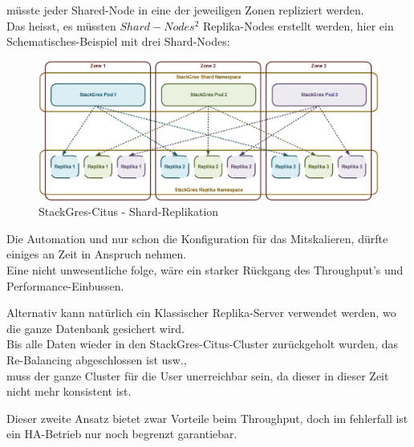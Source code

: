 \begin{flushleft}
\begin{flushleft}
\begin{flushleft}
            müsste jeder Shared-Node in eine der jeweiligen Zonen repliziert werden.\\
            Das heisst, es müssten \(Shard-Nodes^2 \) Replika-Nodes erstellt werden, hier ein Schematisches-Beispiel mit drei Shard-Nodes:
            \begin{figure}[H]
                \centering
                \includegraphics[width=0.8\linewidth]{source/implementation/evaluation/postgresql_ha_solutions/stackgres/stackgres_shard_replication}
                \caption{StackGres-Citus - Shard-Replikation}
                \label{fig:stackgres_shard_replication}
            \end{figure}
            Die Automation und nur schon die Konfiguration für das Mitskalieren, dürfte einiges an Zeit in Anspruch nehmen.\\
            Eine nicht unwesentliche folge, wäre ein starker Rückgang des Throughput's und Performance-Einbussen.
        \end{flushleft}
        \begin{flushleft}
            Alternativ kann natürlich ein Klassischer Replika-Server verwendet werden, wo die ganze Datenbank gesichert wird.\\
            Bis alle Daten wieder in den StackGres-Citus-Cluster zurückgeholt wurden, das Re-Balancing abgeschlossen ist usw.,\\
            muss der ganze Cluster für die User unerreichbar sein, da dieser in dieser Zeit nicht mehr konsistent ist.
        \end{flushleft}
        \begin{flushleft}
            Dieser zweite Ansatz bietet zwar Vorteile beim Throughput, doch im fehlerfall ist ein HA-Betrieb nur noch begrenzt garantiebar.
        \end{flushleft}
    \end{flushleft}
\end{flushleft}
